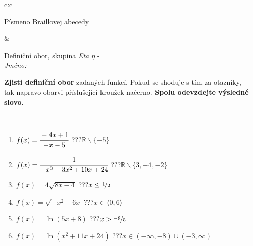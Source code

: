 \documentclass[10pt]{report}
\begin{document}
\begin{tabular}{c:c}
\begin{minipage}[c][104.5mm][t]{0.5\linewidth}
\begin{center}
\begin{minipage}{0.20\linewidth}
\begin{center}
{\small Písmeno Braillovej abecedy}
\end{center}
\end{minipage}
\end{center}
\end{minipage}
&
\begin{minipage}[c][104.5mm][t]{0.5\linewidth}
\begin{center}
\vspace{7mm}
{\huge Definiční obor, skupina \textit{Eta $\eta$} -}\\[5mm]
\textit{Jméno:}\phantom{xxxxxxxxxxxxxxxxxxxxxxxxxxxxxxxxxxxxxxxxxxxxxxxxxxxxxxxxxxxxxxxxx}\\[5mm]
\begin{minipage}{0.95\linewidth}
\begin{center}
\textbf{Zjisti definiční obor} zadaných funkcí. Pokud se shoduje s tím za otazníky,\\tak napravo obarvi příslušející kroužek načerno. \textbf{Spolu odevzdejte výsledné slovo}.
\end{center}
\end{minipage}
\\[1mm]
\begin{minipage}{0.79\linewidth}
\begin{center}
\begin{varwidth}{\linewidth}
\begin{enumerate}
\normalsizerrr
\item $f(x)=\cfrac{-4x+1}{-x-5}$\quad \dotfill\; ???\;\dotfill \quad $\mathbb{R}\smallsetminus\{-5\}$
\item $f(x)=\cfrac{1}{-x^3-3x^2+10x+24}$\quad \dotfill\; ???\;\dotfill \quad $\mathbb{R}\smallsetminus\{3,-4,-2\}$
\item $f(x)=4\sqrt{8x-4}$\quad \dotfill\; ???\;\dotfill \quad $x\leq\nicefrac{1}{2}$
\item $f(x)=\sqrt{-x^2-6x}$\quad \dotfill\; ???\;\dotfill \quad $x\in\langle0 , 6\rangle$
\item $f(x)=\ln{(5x+8)}$\quad \dotfill\; ???\;\dotfill \quad $x>\nicefrac{-8}{5}$
\item $f(x)=\ln{(x^2+11x+24)}$\quad \dotfill\; ???\;\dotfill \quad $x\in(-\infty , -8)\cup(-3 , \infty)$
\end{enumerate}
\end{varwidth}
\end{center}
\end{minipage}
\begin{minipage}{0.20\linewidth}
\begin{center}

\end{center}
\end{minipage}
\end{center}
\end{minipage}
\end{tabular}
\end{document}
